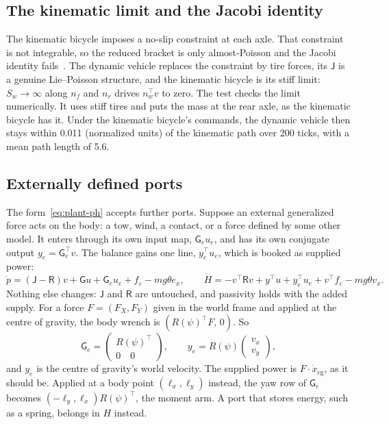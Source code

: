\documentclass[11pt]{article}
\theoremstyle{remark}
\newcommand{\J}{\mathsf J}
\newcommand{\R}{\mathsf R}
\newcommand{\G}{\mathsf G}
\newcommand{\T}{^{\top}}
\begin{document}
\subsection{The kinematic limit and the Jacobi identity}
The kinematic bicycle imposes a no-slip constraint at each axle. That constraint is not integrable,
so the reduced bracket is only almost-Poisson and the Jacobi identity
fails~\cite{vanderschaft1994nonholonomic}. The dynamic vehicle replaces the constraint by tire
forces, its $\J$ is a genuine Lie--Poisson structure, and the kinematic bicycle is its stiff limit:
$S_w\to\infty$ along $n_f$ and $n_r$ drives $n_w\T v$ to zero. The test
 checks the limit numerically. It uses stiff tires
and puts the mass at the rear axle, as the kinematic bicycle has it. Under the kinematic bicycle's
commands, the dynamic vehicle then stays within 0.011 (normalized units) of the kinematic path
over 200 ticks, with a mean path length of 5.6.

\subsection{Externally defined ports}
\label{sec:ports}
The form~\eqref{eq:plant-ph} accepts further ports. Suppose an external generalized force acts on
the body: a tow, wind, a contact, or a force defined by some other model. It enters through its
own input map, $\G_e u_e$, and has its own conjugate output $y_e=\G_e\T v$. The balance gains one
line, $y_e\T u_e$, which is booked as supplied power:
\begin{equation}
  \dot p=(\J-\R)v+\G u+\G_e u_e+f_\varepsilon-mg\theta e_x,\qquad
  \dot H=-v\T\R v+y\T u+y_e\T u_e+v\T f_\varepsilon-mg\theta v_x .
  \label{eq:ext-port}
\end{equation}
Nothing else changes: $\J$ and $\R$ are untouched, and passivity holds with the added supply. For a
force $F=(F_X,F_Y)$ given in the world frame and applied at the centre of gravity, the body
wrench is $(R(\psi)\T F,\,0)$. So
\begin{equation*}
  \G_e=\begin{pmatrix}R(\psi)\T\\0\quad0\end{pmatrix},\qquad y_e=R(\psi)\begin{pmatrix}v_x\\v_y\end{pmatrix},
\end{equation*}
and $y_e$ is the centre of gravity's world velocity. The supplied power is
$F\cdot\dot x_{\mathrm{cg}}$, as it should be. Applied at a body point $(\ell_x,\ell_y)$ instead,
the yaw row of $\G_e$ becomes $(-\ell_y,\ell_x)R(\psi)\T$, the moment arm. A port that stores
energy, such as a spring, belongs in $H$ instead.
\end{document}
